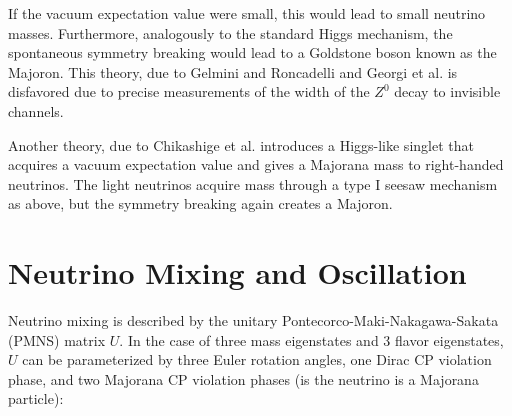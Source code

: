 \documentclass[herrin-thesis.tex]{subfiles}
\begin{document}
If the vacuum expectation value were small, this would lead to small neutrino masses. Furthermore, analogously to the standard Higgs mechanism, the spontaneous symmetry breaking would lead to a Goldstone boson known as the Majoron. This theory, due to Gelmini and Roncadelli\cite{Gelmini:1981uq} and Georgi et al.\cite{Georgi:1981kx} is disfavored due to precise measurements of the width of the \(Z^{0}\) decay to invisible channels.

Another theory, due to Chikashige et al.\cite{Chikashige:1981vn} introduces a Higgs-like singlet that acquires a vacuum expectation value and gives a Majorana mass to right-handed neutrinos. The light neutrinos acquire mass through a type I seesaw mechanism as above, but the symmetry breaking again creates a Majoron.

\section{Neutrino Mixing and Oscillation}
Neutrino mixing is described by the unitary Pontecorco-Maki-Nakagawa-Sakata (PMNS) matrix \(U\). In the case of three mass eigenstates and 3 flavor eigenstates, \(U\) can be parameterized by three Euler rotation angles, one Dirac CP violation phase, and two Majorana CP violation phases (is the neutrino is a Majorana particle):
\end{document}
